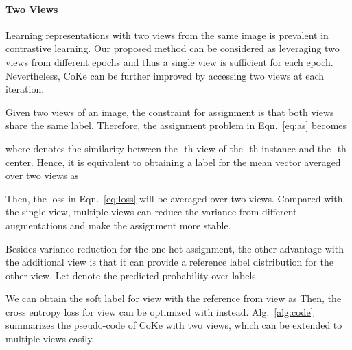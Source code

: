 \documentclass[10pt,twocolumn,letterpaper]{article}
\begin{document}
\paragraph{Two Views}
Learning representations with two views from the same image is prevalent in contrastive learning. Our proposed method can be considered as leveraging two views from different epochs and thus a single view is sufficient for each epoch. Nevertheless, CoKe can be further improved by accessing two views at each iteration. 

Given two views of an image, the constraint for assignment is that both views share the same label. Therefore, the assignment problem in Eqn.~\ref{eq:as} becomes

where  denotes the similarity between the -th view of the -th instance and the -th center. Hence, it is equivalent to obtaining a label for the mean vector averaged over two views as

Then, the loss in Eqn.~\ref{eq:loss} will be averaged over two views. Compared with the single view, multiple views can reduce the variance from different augmentations and make the assignment more stable. 

Besides variance reduction for the one-hot assignment, the other advantage with the additional view is that it can provide a reference label distribution for the other view. Let  denote the predicted probability over labels

We can obtain the soft label for view  with the reference from view  as 
Then, the cross entropy loss for view  can be optimized with  instead. Alg.~\ref{alg:code} summarizes the pseudo-code of CoKe with two views, which can be extended to multiple views easily.
\end{document}
